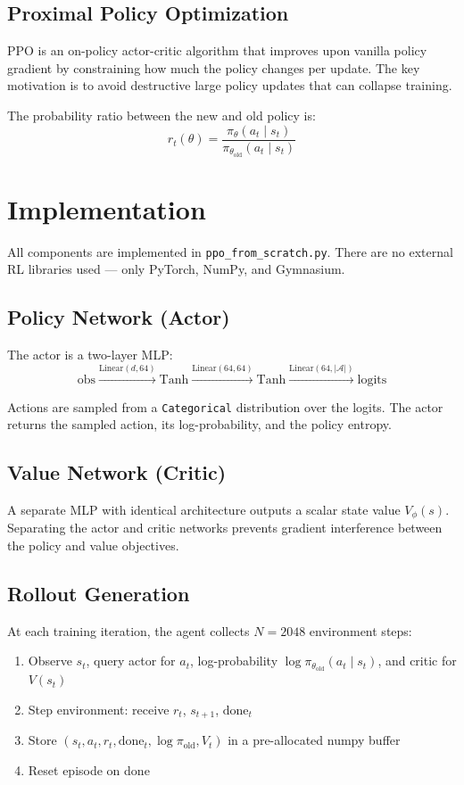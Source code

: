 \documentclass[12pt,a4paper]{article}
\begin{document}
\subsection{Proximal Policy Optimization}

PPO is an on-policy actor-critic algorithm that improves upon vanilla policy gradient by constraining how much the policy changes per update. The key motivation is to avoid destructive large policy updates that can collapse training.

The probability ratio between the new and old policy is:
\[
r_t(\theta) = \frac{\pi_\theta(a_t \mid s_t)}{\pi_{\theta_\text{old}}(a_t \mid s_t)}
\]

\section{Implementation}

All components are implemented in \texttt{ppo\_from\_scratch.py}. There are no external RL libraries used --- only PyTorch, NumPy, and Gymnasium.

\subsection{Policy Network (Actor)}

The actor is a two-layer MLP:
\[
\text{obs} \xrightarrow{\text{Linear}(d, 64)} \text{Tanh} \xrightarrow{\text{Linear}(64, 64)} \text{Tanh} \xrightarrow{\text{Linear}(64, |\mathcal{A}|)} \text{logits}
\]

Actions are sampled from a \texttt{Categorical} distribution over the logits. The actor returns the sampled action, its log-probability, and the policy entropy.

\subsection{Value Network (Critic)}

A separate MLP with identical architecture outputs a scalar state value $V_\phi(s)$. Separating the actor and critic networks prevents gradient interference between the policy and value objectives.

\subsection{Rollout Generation}

At each training iteration, the agent collects $N = 2048$ environment steps:
\begin{enumerate}[noitemsep]
    \item Observe $s_t$, query actor for $a_t$, log-probability $\log \pi_{\theta_\text{old}}(a_t \mid s_t)$, and critic for $V(s_t)$
    \item Step environment: receive $r_t$, $s_{t+1}$, $\text{done}_t$
    \item Store $(s_t, a_t, r_t, \text{done}_t, \log\pi_\text{old}, V_t)$ in a pre-allocated numpy buffer
    \item Reset episode on done
\end{enumerate}
\end{document}
